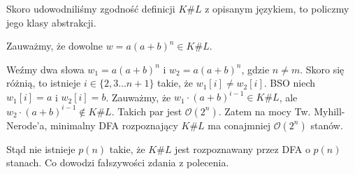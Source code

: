\documentclass{article}
\theoremstyle{definition}
\theoremstyle{remark}
\begin{document}
Skoro udowodniliśmy zgodność definicji \(K \# L\) z opisanym językiem, to policzmy jego klasy abstrakcji.

Zauważmy, że dowolne \(w = a(a+b)^n \in K \# L\).

Weźmy dwa słowa \(w_1 = a(a+b)^n\) i \(w_2 = a(a+b)^n\), gdzie \(n \neq m\).
Skoro się różnią, to istnieje \(i \in \{2, 3 \ldots n+1\}\) takie, że \(w_1[i] \neq w_2[i]\).
BSO niech \(w_1[i] = a\) i \(w_2[i] = b\).
Zauważmy, że \(w_1 \cdot (a+b)^{i-1} \in K \# L\), ale \(w_2 \cdot (a+b)^{i-1} \not \in K \# L\). Takich par jest \( \mathcal{O}(2^n) \).
Zatem na mocy Tw. Myhill-Nerode'a, minimalny DFA rozpoznający \(K \# L\) ma conajmniej \( \mathcal{O}(2^n) \) stanów.

Stąd nie istnieje \(p(n)\) takie, że \(K \# L\) jest rozpoznawany przez DFA o \(p(n)\) stanach.
Co dowodzi fałszywości zdania z polecenia.
\end{document}
